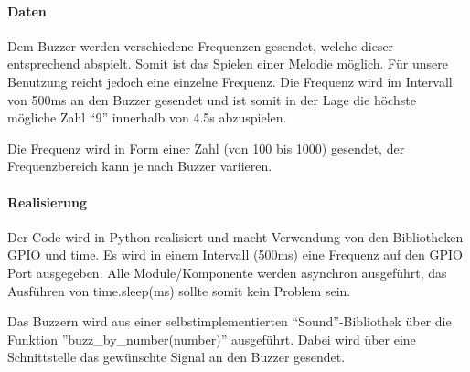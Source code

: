 \documentclass[../../main.tex]{subfiles}
\begin{document}
\paragraph{Daten}
Dem Buzzer werden verschiedene Frequenzen gesendet, welche dieser entsprechend abspielt. Somit ist das Spielen einer Melodie möglich. Für unsere Benutzung reicht jedoch eine einzelne Frequenz. Die Frequenz wird im Intervall von 500ms an den Buzzer gesendet und ist somit in der Lage die höchste mögliche Zahl ``9'' innerhalb von 4.5s abzuspielen.

Die Frequenz wird in Form einer Zahl (von 100 bis 1000) gesendet, der Frequenzbereich kann je nach Buzzer variieren.

\paragraph{Realisierung}
Der Code wird in Python realisiert und macht Verwendung von den Bibliotheken GPIO und time. Es wird in einem Intervall (500ms) eine Frequenz auf den GPIO Port ausgegeben. Alle Module/Komponente werden asynchron ausgeführt, das Ausführen von time.sleep(ms) sollte somit kein Problem sein.

Das Buzzern wird aus einer selbstimplementierten ``Sound''-Bibliothek über die Funktion ''buzz\_by\_number(number)'' ausgeführt. Dabei wird über eine Schnittstelle das gewünschte Signal an den Buzzer gesendet.
\end{document}
